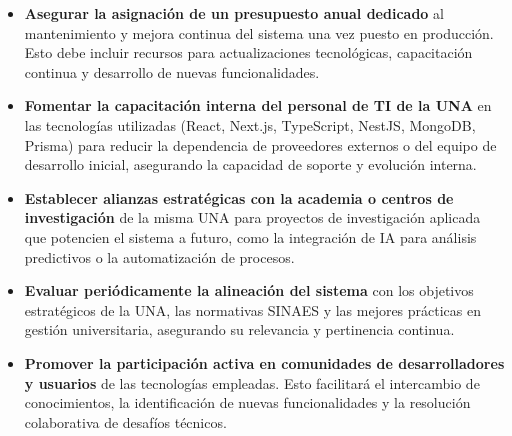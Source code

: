 \begin{itemize}
    \item \textbf{Asegurar la asignación de un presupuesto anual dedicado} al
        mantenimiento y mejora continua del sistema una vez puesto en producción.
        Esto debe incluir recursos para actualizaciones tecnológicas, capacitación
        continua y desarrollo de nuevas funcionalidades.

    \item \textbf{Fomentar la capacitación interna del personal de TI de la UNA}
        en las tecnologías utilizadas (React, Next.js, TypeScript, NestJS, MongoDB,
        Prisma) para reducir la dependencia de proveedores externos o del equipo
        de desarrollo inicial, asegurando la capacidad de soporte y evolución interna.

    \item \textbf{Establecer alianzas estratégicas con la academia o centros de
        investigación} de la misma UNA para proyectos de investigación aplicada
        que potencien el sistema a futuro, como la integración de IA para análisis
        predictivos o la automatización de procesos.

    \item \textbf{Evaluar periódicamente la alineación del sistema} con los
        objetivos estratégicos de la UNA, las normativas SINAES y las mejores prácticas
        en gestión universitaria, asegurando su relevancia y pertinencia continua.

    \item \textbf{Promover la participación activa en comunidades de desarrolladores
        y usuarios} de las tecnologías empleadas. Esto facilitará el intercambio
        de conocimientos, la identificación de nuevas funcionalidades y la resolución
        colaborativa de desafíos técnicos.
\end{itemize}